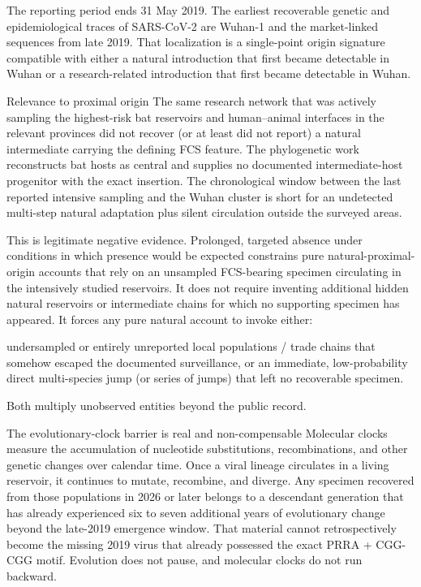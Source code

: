 The reporting period ends 31 May 2019. The earliest recoverable genetic and epidemiological traces of SARS-CoV-2 are Wuhan-1 and the market-linked sequences from late 2019. That localization is a single-point origin signature compatible with either a natural introduction that first became detectable in Wuhan or a research-related introduction that first became detectable in Wuhan.

Relevance to proximal origin
The same research network that was actively sampling the highest-risk bat reservoirs and human–animal interfaces in the relevant provinces did not recover (or at least did not report) a natural intermediate carrying the defining FCS feature. The phylogenetic work reconstructs bat hosts as central and supplies no documented intermediate-host progenitor with the exact insertion. The chronological window between the last reported intensive sampling and the Wuhan cluster is short for an undetected multi-step natural adaptation plus silent circulation outside the surveyed areas.

This is legitimate negative evidence. Prolonged, targeted absence under conditions in which presence would be expected constrains pure natural-proximal-origin accounts that rely on an unsampled FCS-bearing specimen circulating in the intensively studied reservoirs. It does not require inventing additional hidden natural reservoirs or intermediate chains for which no supporting specimen has appeared. It forces any pure natural account to invoke either:

undersampled or entirely unreported local populations / trade chains that somehow escaped the documented surveillance, or  
an immediate, low-probability direct multi-species jump (or series of jumps) that left no recoverable specimen.

Both multiply unobserved entities beyond the public record.

The evolutionary-clock barrier is real and non-compensable
Molecular clocks measure the accumulation of nucleotide substitutions, recombinations, and other genetic changes over calendar time. Once a viral lineage circulates in a living reservoir, it continues to mutate, recombine, and diverge. Any specimen recovered from those populations in 2026 or later belongs to a descendant generation that has already experienced six to seven additional years of evolutionary change beyond the late-2019 emergence window. That material cannot retrospectively become the missing 2019 virus that already possessed the exact PRRA + CGG-CGG motif. Evolution does not pause, and molecular clocks do not run backward.

